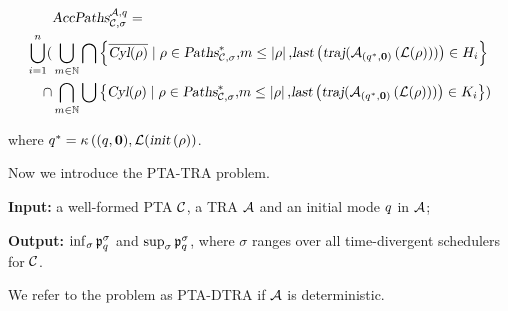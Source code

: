 \begin{small}
\begin{align*}
    &
    \mbox{\sl AccPaths} _{\mathcal{C},\sigma} ^{\mathcal{A},q} = \\
        \bigcup_{i=1}^{n} (
            &
            \bigcup_{m \in \mathbb{N}}
            \bigcap \left \{
                \overline{\mbox{\sl Cyl}(\rho)}
                \mid
                \rho \in \mbox{\sl Paths}^*_{\mathcal{C},\sigma}
                \mbox{,}
                m \le \left| \rho \right|
                \mbox{,}
                \mbox{\sl last}\left(
                    \mbox{\sl traj} ( 
                        {\mathcal{A}}_{\left(q^*,\mathbf{0}\right)}\left(\mathcal{L}(\rho)\right)
                     )
                \right) \in H_i
            \right \}
            \\
            \cap
            &
            \bigcap_{m \in \mathbb{N}}
            \bigcup \left \{
                \mbox{\sl Cyl}(\rho)
                \mid
                \rho \in \mbox{\sl Paths}^*_{\mathcal{C},\sigma}
                \mbox{,}
                m \le \left| \rho \right|
                \mbox{,}
                \mbox{\sl last}\left(
                    \mbox{\sl traj} ( 
                        {\mathcal{A}}_{\left(q^*,\mathbf{0}\right)}\left(\mathcal{L}(\rho)\right)
                     )
                \right) \in K_i
            \right \}
        )
\end{align*}
\end{small}
where
$
    q^*
        =
            \kappa \left(
                (q,\mathbf{0}),
                \mathcal{L} (
                    \mbox{\sl init}\left(\rho\right)
            \right)
$.


Now we introduce the {\sc PTA-TRA} problem.

\begin{compactitem}
\item {\bf Input:} a well-formed PTA $\mathcal{C}$, a TRA  $\mathcal{A}$ and an initial mode $q$ in $\mathcal{A}$;
\item {\bf Output:} $\inf_\sigma \mathfrak{p}_{q}^{\sigma}$ and $\sup_\sigma  \mathfrak{p}_{q}^{\sigma}$, where $\sigma$ ranges over all time-divergent schedulers for $\mathcal{C}$.
\end{compactitem}

We refer to the problem as {\sc PTA-DTRA} if $\mathcal{A}$ is deterministic.

